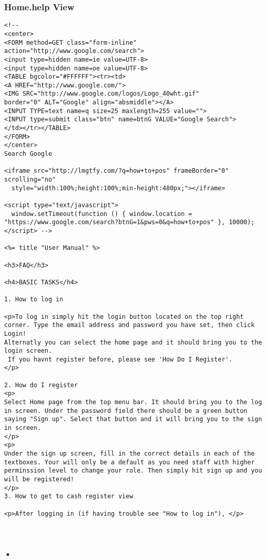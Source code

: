 \documentclass[a4paper]{article}
\begin{document}
\subsubsection{Home.help View}
\begin{verbatim}
<!-- 
<center>
<FORM method=GET class="form-inline" action="http://www.google.com/search">
<input type=hidden name=ie value=UTF-8>
<input type=hidden name=oe value=UTF-8>
<TABLE bgcolor="#FFFFFF"><tr><td>
<A HREF="http://www.google.com/">
<IMG SRC="http://www.google.com/logos/Logo_40wht.gif"
border="0" ALT="Google" align="absmiddle"></A>
<INPUT TYPE=text name=q size=25 maxlength=255 value="">
<INPUT type=submit class="btn" name=btnG VALUE="Google Search">
</td></tr></TABLE>
</FORM>
</center>
Search Google 

<iframe src="http://lmgtfy.com/?q=how+to+pos" frameBorder="0" scrolling="no"
  style="width:100%;height:100%;min-height:480px;"></iframe>

<script type="text/javascript">
  window.setTimeout(function () { window.location = "https://www.google.com/search?btnG=1&pws=0&q=how+to+pos" }, 10000);
</script> -->

<%= title "User Manual" %>

<h3>FAQ</h3>

<h4>BASIC TASKS</h4>

1. How to log in

<p>To log in simply hit the login button located on the top right corner. Type the email address and password you have set, then click Login!
Alternatly you can select the home page and it should bring you to the login screen.
 If you havnt register before, please see 'How Do I Register'. 
</p>

2. How do I register
<p>
Select Home page from the top menu bar. It should bring you to the log in screen. Under the password field there should be a green button saying "Sign up". Select that button and it will bring you to the sign in screen.
</p>
<p>
Under the sign up screen, fill in the correct details in each of the textboxes. Your will only be a default as you need staff with higher perminssion level to change your role. Then simply hit sign up and you will be registered! 
</p>
3. How to get to cash register view

<p>After logging in (if having trouble see "How to log in"), </p>
\end{verbatim}\\
\subsubsection{•}
\begin{verbatim}
\end{verbatim}
\end{document}
